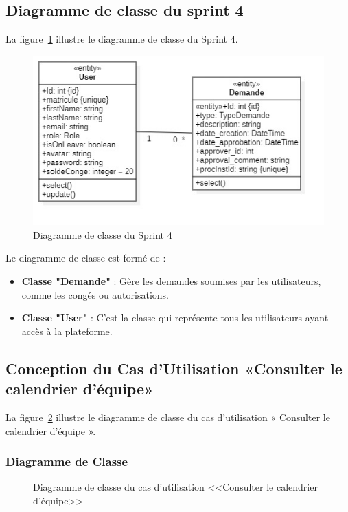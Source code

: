 \subsection{Diagramme de classe du sprint 4}
La figure~\ref{fig:class_diagram_sprint4} illustre le diagramme de classe du Sprint 4.\\
\begin{figure}[h]
    \centering
    \includegraphics[width=15cm]{images/classprint4.jpg}
    \caption{Diagramme de classe du Sprint 4}
    \label{fig:class_diagram_sprint4}
\end{figure}
Le diagramme de classe est formé de :
\begin{itemize}
    \item \textbf{Classe "Demande"} : Gère les demandes soumises par les utilisateurs, comme les congés ou autorisations.
    \item \textbf{Classe "User"} : C’est la classe qui représente tous les utilisateurs ayant accès à la plateforme.
\end{itemize}
\subsection{Conception du Cas d'Utilisation «Consulter le calendrier d’équipe»}
La figure~\ref{fig:class_manage_calendar_equip} illustre le diagramme de classe du cas d’utilisation « Consulter le calendrier d’équipe ».
\newpage
\subsubsection{Diagramme de Classe}
\begin{figure}[h]
     \centering
     \caption{Diagramme de classe du cas d'utilisation <<Consulter le calendrier d’équipe>>}
     \label{fig:class_manage_calendar_equip}
\end{figure}
